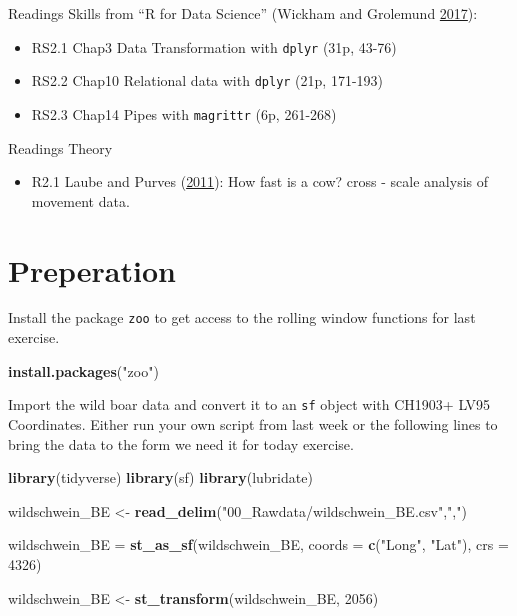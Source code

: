 \documentclass[]{book}
\newenvironment{Shaded}{\begin{snugshade}}{\end{snugshade}}
\newcommand{\KeywordTok}[1]{\textcolor[rgb]{0.13,0.29,0.53}{\textbf{#1}}}
\newcommand{\DataTypeTok}[1]{\textcolor[rgb]{0.13,0.29,0.53}{#1}}
\newcommand{\DecValTok}[1]{\textcolor[rgb]{0.00,0.00,0.81}{#1}}
\newcommand{\StringTok}[1]{\textcolor[rgb]{0.31,0.60,0.02}{#1}}
\newcommand{\NormalTok}[1]{#1}
\providecommand{\tightlist}{%
  \setlength{\itemsep}{0pt}\setlength{\parskip}{0pt}}
\begin{document}
Readings Skills from ``R for Data Science'' (Wickham and Grolemund
\protect\hyperlink{ref-wickham2017}{2017}):

\begin{itemize}
\tightlist
\item
  RS2.1 Chap3 Data Transformation with \texttt{dplyr} (31p, 43-76)
\item
  RS2.2 Chap10 Relational data with \texttt{dplyr} (21p, 171-193)
\item
  RS2.3 Chap14 Pipes with \texttt{magrittr} (6p, 261-268)
\end{itemize}

Readings Theory

\begin{itemize}
\tightlist
\item
  R2.1 Laube and Purves (\protect\hyperlink{ref-laube2011}{2011}): How
  fast is a cow? cross - scale analysis of movement data.
\end{itemize}

\section{Preperation}\label{preperation-1}

Install the package \texttt{zoo} to get access to the rolling window
functions for last exercise.

\begin{Shaded}
\begin{Highlighting}[]
\KeywordTok{install.packages}\NormalTok{(}\StringTok{"zoo"}\NormalTok{)}
\end{Highlighting}
\end{Shaded}

Import the wild boar data and convert it to an \texttt{sf} object with
CH1903+ LV95 Coordinates. Either run your own script from last week or
the following lines to bring the data to the form we need it for today
exercise.

\begin{Shaded}
\begin{Highlighting}[]
\KeywordTok{library}\NormalTok{(tidyverse)}
\KeywordTok{library}\NormalTok{(sf)}
\KeywordTok{library}\NormalTok{(lubridate)}

\NormalTok{wildschwein_BE <-}\StringTok{ }\KeywordTok{read_delim}\NormalTok{(}\StringTok{"00_Rawdata/wildschwein_BE.csv"}\NormalTok{,}\StringTok{","}\NormalTok{)}

\NormalTok{wildschwein_BE =}\StringTok{ }\KeywordTok{st_as_sf}\NormalTok{(wildschwein_BE, }\DataTypeTok{coords =} \KeywordTok{c}\NormalTok{(}\StringTok{"Long"}\NormalTok{, }\StringTok{"Lat"}\NormalTok{), }\DataTypeTok{crs =} \DecValTok{4326}\NormalTok{)}

\NormalTok{wildschwein_BE <-}\StringTok{ }\KeywordTok{st_transform}\NormalTok{(wildschwein_BE, }\DecValTok{2056}\NormalTok{)}
\end{Highlighting}
\end{Shaded}
\end{document}
